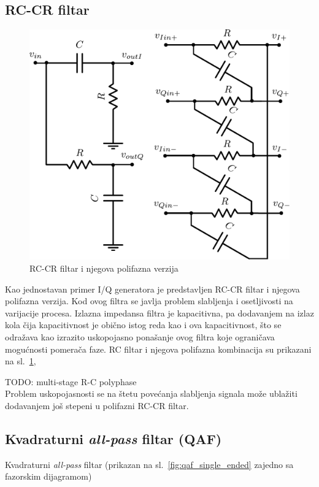 \documentclass[journal,twocolumn,letterpaper]{IEEEJERM}
\begin{document}
\subsection{RC-CR filtar}

\begin{figure}[!htbp]
  \centering
  \includegraphics[width=0.8\linewidth]{rc_cr_single.pdf}
  \caption{RC-CR filtar i njegova polifazna verzija}
  \label{fig:rc_rc_single}
\end{figure}


Kao jednostavan primer I/Q generatora je predstavljen RC-CR filtar i njegova polifazna verzija. Kod ovog filtra se javlja problem slabljenja i osetljivosti na varijacije procesa. Izlazna impedansa filtra je kapacitivna, pa dodavanjem na izlaz kola čija kapacitivnost je obično istog reda kao i ova kapacitivnost, što se odražava kao izrazito uskopojasno ponašanje ovog filtra koje ograničava mogućnosti pomerača faze. RC filtar i njegova polifazna kombinacija su prikazani na sl.~\ref{fig:rc_rc_single},

TODO: multi-stage R-C polyphase \\

Problem uskopojasnosti se na štetu povećanja slabljenja signala može ublažiti dodavanjem još stepeni u polifazni RC-CR filtar.


\subsection{Kvadraturni \textit{all-pass} filtar (QAF)}

Kvadraturni \textit{all-pass} filtar (prikazan na sl.~\ref{fig:qaf_single_ended} zajedno sa fazorskim dijagramom)
\end{document}
